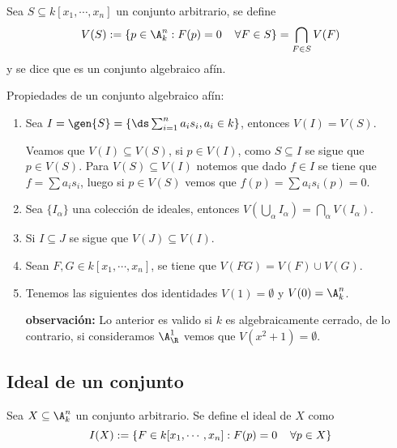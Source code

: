 \documentclass{article}
\begin{document}
\begin{dfn}
    Sea $S\subseteq k[x_{1},\cdots,x_{n}]$ un conjunto arbitrario, se define 
    \begin{equation*}
        V(S):=\{p\in\A_{k}^{n}:F(p)=0\hspace{4mm}\forall F\in S\}=\bigcap_{F\in S} V(F)
    \end{equation*}
    y se dice que es un conjunto algebraico afín.
\end{dfn}

\noindent Propiedades de un conjunto algebraico afín:
\begin{enumerate}
    \item Sea $I=\gen{S}=\left\{\ds\sum_{i=1}^{n}a_{i}s_{i},a_{i}\in k\right\}$, entonces 
    $V(I)=V(S)$.
    \begin{dem}
        Veamos que $V(I)\subseteq V(S)$, si $p\in V(I)$, como $S\subseteq I$ se sigue que 
        $p\in V(S)$. Para $V(S)\subseteq V(I)$ notemos que dado $f\in I$ se tiene que 
        $f=\sum a_{i}s_{i}$, luego si $p\in V(S)$ vemos que $f(p)=\sum a_{i}s_{i}(p)=0$.
    \end{dem}

    \item Sea $\{I_{\alpha}\}$ una colección de ideales, entonces 
    $V(\bigcup_{\alpha}I_{\alpha})=\bigcap_{\alpha}V(I_{\alpha})$.
    \item Si $I\subseteq J$ se sigue que $V(J)\subseteq V(I)$.
    \item Sean $F,G\in k[x_{1},\cdots,x_{n}]$, se tiene que $V(FG)=V(F)\cup V(G)$.
    \item Tenemos las siguientes dos identidades $V(1)=\emptyset$ y $V(0)=\A_{k}^{n}$.
    
    \textbf{observación:} Lo anterior es valido si $k$ es algebraicamente cerrado, de lo 
    contrario, si consideramos $\A_{\R}^{1}$ vemos que $V(x^{2}+1)=\emptyset$.
\end{enumerate}

\subsection{Ideal de un conjunto}
\begin{dfn}
    Sea $X\subseteq\A_{k}^{n}$ un conjunto arbitrario. Se define el ideal de $X$ como
    \begin{equation*}
        I(X):=\left\{F\in k[x_{1},\cdots,x_{n}]:F(p)=0\hspace{4mm}\forall p\in X\right\}
    \end{equation*}
\end{dfn}
\end{document}
